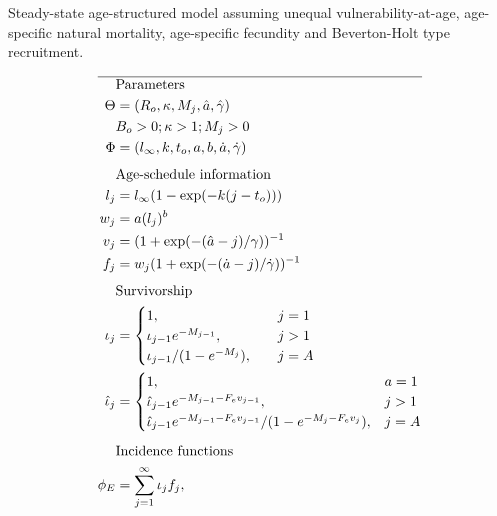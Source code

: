 \begin{table}
\caption{Steady-state age-structured model assuming unequal
vulnerability-at-age, age-specific natural mortality, age-specific
fecundity and Beverton-Holt type recruitment.}\label{tab:equilibrium_model} 
\tableEq
    \begin{align}
           \hline
        &\mbox{Parameters} \nonumber \\
            \Theta &= (R_o,\kappa,M_j,\hat{a},\hat{\gamma})      \label{T2.1}\\
            &B_o>0; \kappa > 1; M_j > 0\\
            \Phi &= (l_\infty, k, t_o,a,b,\dot{a},\dot{\gamma})  \label{T2.3}\\[1ex]
        &\mbox{Age-schedule information} \nonumber\\
            l_j&=l_\infty(1-\exp(-k(j-t_o)))                     \label{T2.4}\\
            w_j&=a(l_j)^b                                        \label{T2.5}\\
            v_j&=(1+\exp(-(\hat{a}-j)/\gamma))^{-1}              \label{T2.6}\\
            f_j&=w_j(1+\exp(-(\dot{a}-j)/\dot{\gamma}))^{-1}     \label{T2.7}\\[1ex]
        &\mbox{Survivorship} \nonumber\\
            \iota_j&=\begin{cases} 1, &\quad j=1                 \label{T2.8}\\
            \iota_{j-1}e^{-M_{j-1}},&\quad j>1\\
            \iota_{j-1}/(1-e^{-M_j}),&\quad j=A \end{cases}\\
            \hat{\iota}_j&=\begin{cases} 1, & a=1\\
            \hat{\iota}_{j-1}e^{-M_{j-1}-F_e v_{j-1}},& j>1\\
            \hat{\iota}_{j-1}e^{-M_{j-1}-F_e v_{j-1}}/(1-e^{-M_{j}-F_e v_{j}}),& j=A
            \end{cases}                                         \label{T2.9}\\[1ex]
        &\mbox{Incidence functions} \nonumber \\
            \phi_E&=\sum_{j=1}^\infty \iota_j f_j, \quad

\end{align}
\end{table}
